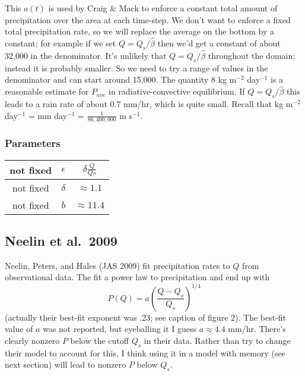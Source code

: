 \documentclass[10pt]{article}
\begin{document}
This $a(t)$ is used by Craig \& Mack to enforce a constant total amount of precipitation over the area at each time-step.
We don't want to enforce a fixed total precipitation rate, so we will replace the average on the bottom by a constant; for example if we set $Q=Q_s/\hat{\beta}$ then we'd get a constant of about 32,000 in the denominator.
It's unlikely that $Q = Q_s/\hat{\beta}$ throughout the domain; instead it is probably smaller.
So we need to try a range of values in the denominator and can start around 15,000.
The quantity $8$ kg m$^{-2}$ day$^{-1}$ is a reasonable estimate for $P_{ave}$ in radiative-convective equilibrium.
If $Q=Q_s/\hat{\beta}$ this leads to a rain rate of about 0.7 mm/hr, which is quite small.
Recall that kg m$^{-2}$ day$^{-1}$ = mm day$^{-1}$ = $\frac{1}{86,400,000}$ m s$^{-1}$. 
\subsubsection{Parameters}
\begin{center}
	\begin{tabular}{||c |c|c|| } 
		\hline
		not fixed & $\epsilon$ &   $\delta \frac{Q}{Qs}$ \\ \hline
		not fixed & $\delta$ & $ \approx 1.1$  \\ \hline
		not fixed & $b$& $ \approx 11.4$\\ \hline
	\end{tabular}
\end{center}

\subsection{Neelin et al.~2009}
Neelin, Peters, and Hales (JAS 2009) fit precipitation rates to $Q$ from observational data.
The fit a power law to precipitation and end up with
\[P(Q) = a\left(\frac{Q-Q_s}{Q_s}\right)^{1/4}\]
(actually their best-fit exponent was .23; see caption of figure 2).
The best-fit value of $a$ was not reported, but eyeballing it I guess $a\approx 4.4$ mm/hr.
There's clearly nonzero $P$ below the cutoff $Q_s$ in their data.
Rather than try to change their model to account for this, I think using it in a model with memory (see next section) will lead to nonzero $P$ below $Q_s$. 
\end{document}
